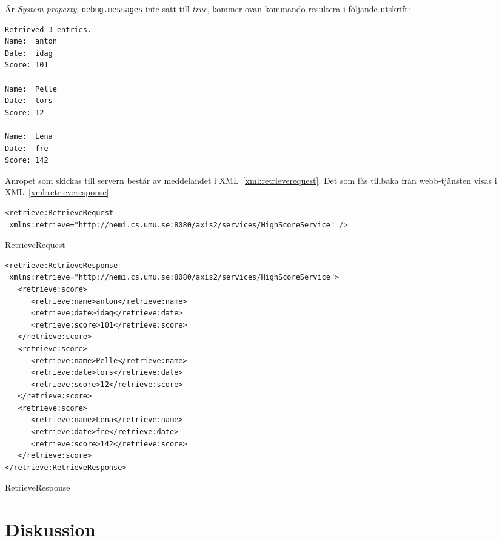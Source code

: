 \documentclass[a4paper, 12pt]{article}
\begin{document}
Är \textit{System property}, \verb!debug.messages! inte satt till
\textit{true}, kommer ovan kommando resultera i följande utskrift:

\begin{footnotesize}
\begin{verbatim}
Retrieved 3 entries.
Name:  anton
Date:  idag
Score: 101

Name:  Pelle
Date:  tors
Score: 12

Name:  Lena
Date:  fre
Score: 142
\end{verbatim}
\end{footnotesize}

Anropet som skickas till servern består av meddelandet i
XML~\ref{xml:retrieverequest}. Det som fås tillbaka från webb-tjänsten
visas i XML~\ref{xml:retrieveresponse}.

\begin{xml}
  \begin{footnotesize}
\begin{verbatim}
<retrieve:RetrieveRequest
 xmlns:retrieve="http://nemi.cs.umu.se:8080/axis2/services/HighScoreService" />
\end{verbatim}
  \end{footnotesize}
  \caption{RetrieveRequest}\label{xml:retrieverequest}
\end{xml}

\begin{xml}
  \begin{footnotesize}
\begin{verbatim}
<retrieve:RetrieveResponse
 xmlns:retrieve="http://nemi.cs.umu.se:8080/axis2/services/HighScoreService">
   <retrieve:score>
      <retrieve:name>anton</retrieve:name>
      <retrieve:date>idag</retrieve:date>
      <retrieve:score>101</retrieve:score>
   </retrieve:score>
   <retrieve:score>
      <retrieve:name>Pelle</retrieve:name>
      <retrieve:date>tors</retrieve:date>
      <retrieve:score>12</retrieve:score>
   </retrieve:score>
   <retrieve:score>
      <retrieve:name>Lena</retrieve:name>
      <retrieve:date>fre</retrieve:date>
      <retrieve:score>142</retrieve:score>
   </retrieve:score>
</retrieve:RetrieveResponse>
\end{verbatim}
  \end{footnotesize}
  \caption{RetrieveResponse}\label{xml:retrieveresponse}
\end{xml}

\section{Diskussion}\label{Diskussion}
\end{document}

